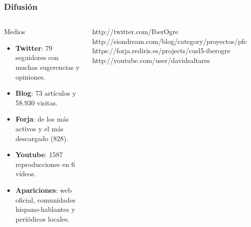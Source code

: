 \documentclass[green]{beamer}
\begin{document}
\begin{frame}
\transdissolve
    \frametitle{Difusión}
    
    \begin{columns}[t]
    \column{200pt}
	
	\scriptsize{
	\begin{block}{Medios}
            \begin{itemize}
                \item \textbf{Twitter}: 79 seguidores con muchas sugerencias y opiniones.
		\item \textbf{Blog}: 73 artículos y 58.930 visitas.
		\item \textbf{Forja}: de los más activos y el más descargado (828).
		\item \textbf{Youtube}: 1587 reproducciones en 6 vídeos.
		\item \textbf{Apariciones}: web oficial, comunidades hispano-hablantes y periódicos locales.
            \end{itemize}            
        \end{block}
	
	\tiny{
	\begin{block}{}
            http://twitter.com/IberOgre
	    http://siondream.com/blog/category/proyectos/pfc
	    https://forja.rediris.es/projects/cusl5-iberogre
	    http://youtube.com/user/davidsaltares
        \end{block}
	}
	}
	

    \column{100pt}
	

\end{columns}
\end{frame}
\end{document}
